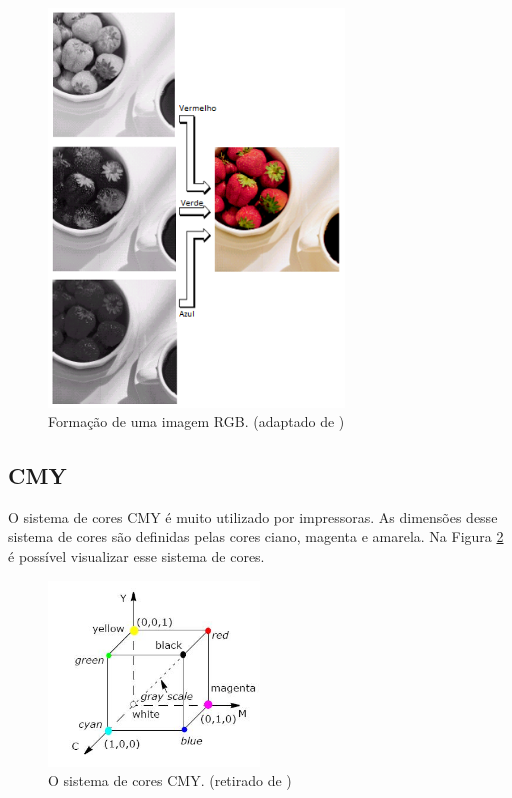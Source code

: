 \documentclass[	12pt, Times, openright, twoside, a4paper, english, brazil]{abntex2}
\begin{document}
\begin{figure}[!htb]
\centering \includegraphics[width=0.7\textwidth]{figuraFormacaoImagemRGB.png}
\caption{Formação de uma imagem RGB. (adaptado de ) \label{fig:figuraFormacaoImagemRGB}}
\end{figure}

\subsection{CMY}
O sistema de cores CMY é muito utilizado por impressoras. As dimensões desse sistema de cores são definidas pelas cores ciano, magenta e amarela. Na Figura \ref{fig:figuraCMY} é possível visualizar esse sistema de cores. 

\begin{figure}[!htb]
\centering \includegraphics[width=0.5\textwidth]{figuraCMY.png}
\caption{O sistema de cores CMY. (retirado de ) \label{fig:figuraCMY}}
\end{figure}
\end{document}
